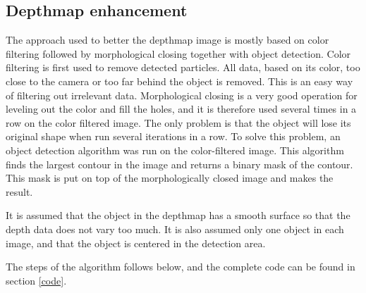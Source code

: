 

\subsection{Depthmap enhancement} \label{section:depthmap}

The approach used to better the depthmap image is mostly based on color filtering followed by morphological closing together with object detection. 
Color filtering is first used to remove detected particles. All data, based on its color, too close to the camera or too far behind the object is removed. This is an easy way of filtering out irrelevant data. Morphological closing is a very good operation for leveling out the color and fill the holes, and it is therefore used several times in a row on the color filtered image. The only problem is that the object will lose its original shape when run several iterations in a row. To solve this problem, an object detection algorithm was run on the color-filtered image. This algorithm finds the largest contour in the image and returns a binary mask of the contour. This mask is put on top of the morphologically closed image and makes the result.

It is assumed that the object in the depthmap has a smooth surface so that the depth data does not vary too much. It is also assumed only one object in each image, and that the object is centered in the detection area.

The steps of the algorithm follows below, and the complete code can be found in section \ref{code}.

